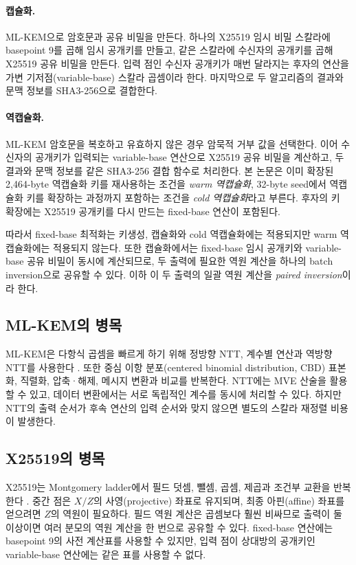 \documentclass[runningheads,orivec]{llncs}
\begin{document}
\paragraph{캡슐화.}
ML-KEM으로 암호문과 공유 비밀을 만든다. 하나의 X25519 임시 비밀 스칼라에
basepoint 9를 곱해 임시 공개키를 만들고, 같은 스칼라에 수신자의 공개키를 곱해
X25519 공유 비밀을 만든다. 입력 점인 수신자 공개키가 매번 달라지는 후자의 연산을
가변 기저점(variable-base) 스칼라 곱셈이라 한다. 마지막으로 두 알고리즘의 결과와
문맥 정보를 SHA3-256으로 결합한다.

\paragraph{역캡슐화.}
ML-KEM 암호문을 복호하고 유효하지 않은 경우 암묵적 거부 값을 선택한다. 이어
수신자의 공개키가 입력되는 variable-base 연산으로 X25519 공유 비밀을 계산하고,
두 결과와 문맥 정보를 같은 SHA3-256 결합 함수로 처리한다. 본 논문은 이미 확장된
2,464-byte 역캡슐화 키를 재사용하는 조건을 \emph{warm 역캡슐화}, 32-byte seed에서
역캡슐화 키를 확장하는 과정까지 포함하는 조건을 \emph{cold 역캡슐화}라고 부른다.
후자의 키 확장에는 X25519 공개키를 다시 만드는 fixed-base 연산이 포함된다.

따라서 fixed-base 최적화는 키생성, 캡슐화와 cold 역캡슐화에는 적용되지만 warm
역캡슐화에는 적용되지 않는다. 또한 캡슐화에서는 fixed-base 임시 공개키와
variable-base 공유 비밀이 동시에 계산되므로, 두 출력에 필요한 역원 계산을 하나의
batch inversion으로 공유할 수 있다. 이하 이 두 출력의 일괄 역원 계산을
\emph{paired inversion}이라 한다.

\subsection{ML-KEM의 병목}

ML-KEM은 다항식 곱셈을 빠르게 하기 위해 정방향 NTT, 계수별 연산과 역방향 NTT를
사용한다 \cite{FIPS203}. 또한 중심 이항 분포(centered binomial distribution, CBD)
표본화, 직렬화, 압축·해제, 메시지 변환과 비교를 반복한다. NTT에는 MVE 산술을
활용할 수 있고, 데이터 변환에서는 서로 독립적인 계수를 동시에 처리할 수 있다.
하지만 NTT의 출력 순서가 후속 연산의 입력 순서와 맞지 않으면 별도의 스칼라 재정렬
비용이 발생한다.

\subsection{X25519의 병목}

X25519는 Montgomery ladder에서 필드 덧셈, 뺄셈, 곱셈, 제곱과 조건부 교환을
반복한다 \cite{RFC7748}. 중간 점은 $X/Z$의 사영(projective) 좌표로 유지되며,
최종 아핀(affine) 좌표를 얻으려면 $Z$의 역원이 필요하다. 필드 역원 계산은 곱셈보다
훨씬 비싸므로 출력이 둘 이상이면 여러 분모의 역원 계산을 한 번으로 공유할 수 있다.
fixed-base 연산에는 basepoint 9의 사전 계산표를 사용할 수 있지만, 입력 점이
상대방의 공개키인 variable-base 연산에는 같은 표를 사용할 수 없다.
\end{document}
